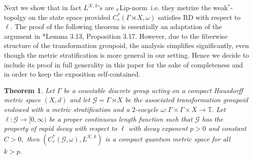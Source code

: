 \documentclass[a4paper,11pt,reqno]{amsart}
\theoremstyle{plain}
\newtheorem{thm}{Theorem}[section]
\theoremstyle{mainthmstyle}
\theoremstyle{named}
\numberwithin{equation}{section}
\newcommand{\clipnorm}{$_{\text{\rm c}}$Lip-norm}
\begin{document}
Next we show that in fact $L^{\mathcal{K},k}$'s are \clipnorm\  i.e. they metrize the weak$^{\ast}$-topolgy on the state space provided $C^{\ast}_{r}(\Gamma\rtimes X,\omega)$ satisfies RD with respect to $\ell.$ The proof of the following theorem is essentially an adaptation of the argument in \cite{austad2026quantum}*{Lemma 3.13, Proposition 3.17}. However, due to the fiberwise structure of the transformation groupoid, the analysis simplifies significantly, even though the metric stratification is more general in our setting. Hence we decide to include its proof in full generality in this paper for the sake of completeness and in order to keep the exposition self-contained. 
\begin{thm} \label {CQMS}
Let $\Gamma$ be a countable discrete group acting on a compact Hausdorff metric space $(X, d)$ and let $\mathcal G = \Gamma \rtimes X$ be the associated transformation groupoid endowed with a metric stratification and a $2$-cocycle $\omega : \Gamma \times \Gamma \times X \rightarrow \mathbb T.$ Let $\ell \colon \mathcal G \to [0,\infty)$ be a proper continuous length function such that $\mathcal G$ has the property of rapid decay with respect to $\ell$ with decay exponent $p > 0$ and constant $C > 0,$ then $\left (C_r^{\ast} (\mathcal G, \omega), L^{\mathcal K, k} \right )$ is a compact quantum metric space for all $k > p.$
\end{thm}
\end{document}
